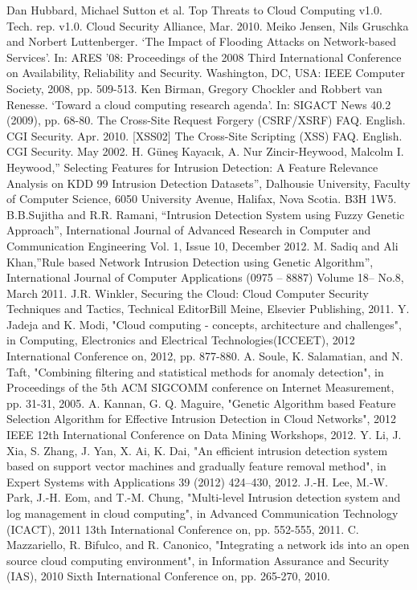 \documentclass[a4paper,oneside,12pt]{report}
\begin{document}
\begin{thebibliography}{99}
\begin{LTRbibitems}
Dan Hubbard, Michael Sutton et al. Top Threats to Cloud Computing v1.0. Tech. rep. v1.0. Cloud Security Alliance, Mar. 2010.
Meiko Jensen, Nils Gruschka and Norbert Luttenberger. `The Impact of Flooding Attacks on Network-based Services'. In: ARES '08: Proceedings of the 2008 Third International Conference on Availability, Reliability and Security. Washington, DC, USA: IEEE Computer Society, 2008, pp. 509-513.
Ken Birman, Gregory Chockler and Robbert van Renesse. `Toward a cloud computing research agenda'. In: SIGACT News 40.2 (2009), pp. 68-80.
The Cross-Site Request Forgery (CSRF/XSRF) FAQ. English. CGI Security. Apr. 2010.
[XSS02] The Cross-Site Scripting (XSS) FAQ. English. CGI Security. May 2002.
H. Güneş Kayacık, A. Nur Zincir-Heywood, Malcolm I. Heywood,” Selecting Features for Intrusion Detection: A Feature Relevance Analysis on KDD 99 Intrusion Detection Datasets”, Dalhousie University, Faculty of Computer Science, 6050 University Avenue, Halifax, Nova Scotia. B3H 1W5.
B.B.Sujitha and R.R. Ramani, “Intrusion Detection System using Fuzzy Genetic Approach”, International Journal of Advanced Research in Computer and Communication Engineering Vol. 1, Issue 10, December 2012.
M. Sadiq and Ali Khan,”Rule based Network Intrusion Detection using Genetic Algorithm”, International Journal of Computer Applications (0975 – 8887) Volume 18– No.8, March 2011.
 J.R. Winkler, Securing the Cloud: Cloud Computer Security Techniques and Tactics, Technical EditorBill Meine, Elsevier Publishing, 2011.
Y. Jadeja and K. Modi, "Cloud computing - concepts, architecture and challenges", in Computing, Electronics and Electrical Technologies(ICCEET), 2012 International Conference on, 2012, pp. 877-880.
A. Soule, K. Salamatian, and N. Taft, "Combining filtering and statistical methods for anomaly detection", in Proceedings of the 5th ACM SIGCOMM conference on Internet Measurement, pp. 31-31, 2005.
A. Kannan, G. Q. Maguire, "Genetic Algorithm based Feature Selection Algorithm for Effective Intrusion Detection in Cloud Networks", 2012 IEEE 12th International Conference on Data Mining Workshops, 2012.
Y. Li, J. Xia, S. Zhang, J. Yan, X. Ai, K. Dai, "An efficient intrusion detection system based on support vector machines and gradually feature removal method", in Expert Systems with Applications 39 (2012) 424–430, 2012.
J.-H. Lee, M.-W. Park, J.-H. Eom, and T.-M. Chung, "Multi-level Intrusion detection system and log management in cloud computing", in Advanced Communication Technology (ICACT), 2011 13th International Conference on, pp. 552-555, 2011.
C. Mazzariello, R. Bifulco, and R. Canonico, "Integrating a network ids into an open source cloud computing environment", in Information Assurance and Security (IAS), 2010 Sixth International Conference on, pp. 265-270, 2010.
\end{LTRbibitems}
\end{thebibliography}
\end{document}
